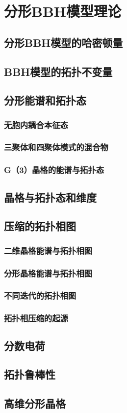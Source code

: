 \chapter{分形BBH模型理论}
\section{分形BBH模型的哈密顿量}
\section{BBH模型的拓扑不变量}

\section{分形能谱和拓扑态}
\subsection{无胞内耦合本征态}
\subsection{三聚体和四聚体模式的混合物}
\subsection{G（3）晶格的能谱与拓扑态}

\section{晶格与拓扑态和维度}

\section{压缩的拓扑相图}
\subsection{二维晶格能谱与拓扑相图}
\subsection{分形晶格能谱与拓扑相图}
\subsection{不同迭代的拓扑相图}
\subsection{拓扑相压缩的起源}

\section{分数电荷}
\section{拓扑鲁棒性}
\section{高维分形晶格}